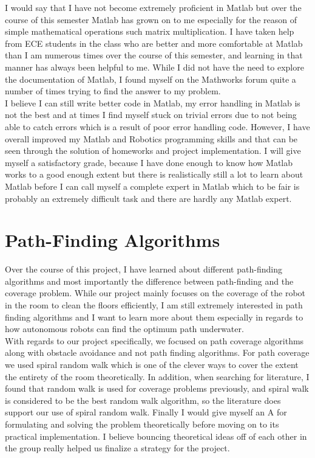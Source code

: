\documentclass[12pt]{article}
\begin{document}
I would say that I have not become extremely proficient in Matlab but over the
course of this semester Matlab has grown on to me especially for the reason of
simple mathematical operations such matrix multiplication. I have taken help
from ECE students in the class who are better and more comfortable at Matlab
than I am numerous times over the course of this semester, and learning in that
manner has always been helpful to me. While I did not have the need to explore
the documentation of Matlab, I found myself on the Mathworks forum quite a
number of times trying to find the answer to my problem. \newline \\ I believe
I can still write better code in Matlab, my error handling in Matlab is not the
best and at times I find myself stuck on trivial errors due to not being able
to catch errors which is a result of poor error handling code. However, I have
overall improved my Matlab and Robotics programming skills and that can be seen
through the solution of homeworks and project implementation. I will give
myself a satisfactory grade, because I have done enough to know how Matlab
works to a good enough extent but there is realistically still a lot to learn
about Matlab before I can call myself a complete expert in Matlab which to be
fair is probably an extremely difficult task and there are hardly any Matlab
expert.

\section{Path-Finding Algorithms}
Over the course of this project, I have learned about different path-finding
algorithms and most importantly the difference between path-finding and the
coverage problem. While our project mainly focuses on the coverage of the robot in the room to clean the floors efficiently, I am still extremely interested in path finding algorithms and I want to learn more about them especially in regards to how autonomous robots can find the optimum path underwater. 
\newline \\
With regards to our project specifically, we focused on path coverage algorithms along with obstacle avoidance and not path finding algorithms. For path coverage we used spiral random walk which is one of the clever ways to cover the extent the entirety of the room theoretically. In addition, when searching for literature, I found that random walk is used for coverage problems previously, and spiral walk is considered to be the best random walk algorithm, so the literature does support our use of spiral random walk. Finally I would give myself an A for formulating and solving the problem theoretically before moving on to its practical implementation. I believe bouncing theoretical ideas off of each other in the group really helped us finalize a strategy for the project.
\end{document}
